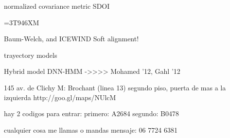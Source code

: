 normalized covariance metric
SDOI

=3T946XM

Baum-Welch, and ICEWIND
Soft alignment!

trayectory models

Hybrid model DNN-HMM ->>>> Mohamed '12, Gahl '12


145 av. de Clichy
M: Brochant (linea 13)
segundo piso, puerta de mas a la izquierda
http://goo.gl/maps/NUlcM

hay 2 codigos para entrar:
primero: A2684
segundo: B0478

cualquier cosa me llamas o mandas mensaje:
06 7724 6381
